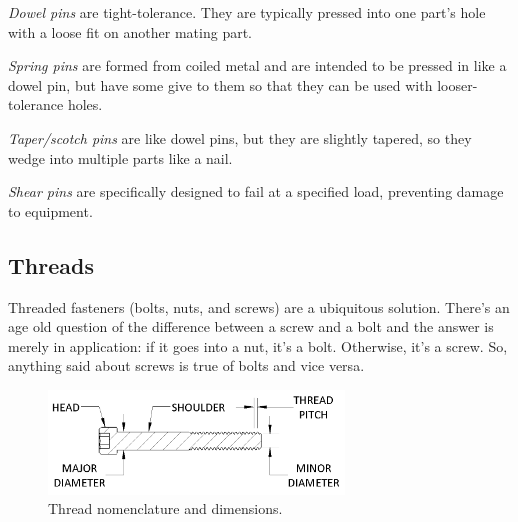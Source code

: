 \documentclass[10pt,letterpaper]{book}
\begin{document}
	\begin{asparaenum}[a)]
		\item \textit{Dowel pins} are tight-tolerance. They are typically pressed into one part's hole with a loose fit on another mating part.
		\item \textit{Spring pins} are formed from coiled metal and are intended to be pressed in like a dowel pin, but have some give to them so that they can be used with looser-tolerance holes.
		\item \textit{Taper/scotch pins} are like dowel pins, but they are slightly tapered, so they wedge into multiple parts like a nail.
		\item \textit{Shear pins} are specifically designed to fail at a specified load, preventing damage to equipment.
	\end{asparaenum}
	
	\subsection{Threads} \label{section:threads}
	
	Threaded fasteners (bolts, nuts, and screws) are a ubiquitous solution. There's an age old question of the difference between a screw and a bolt and the answer is merely in application: if it goes into a nut, it's a bolt. Otherwise, it's a screw. So, anything said about screws is true of bolts and vice versa.
	
	\begin{figure}[H]
		\includegraphics[width=0.7\textwidth]{imgs/thread_nomenclature.png}
		\caption{Thread nomenclature and dimensions.}
	\end{figure}
	
\end{document}
